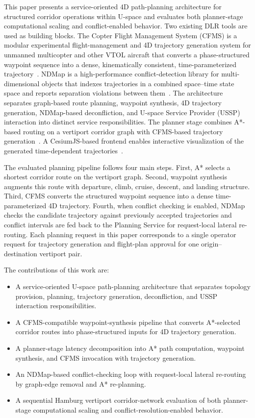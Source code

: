 This paper presents a service-oriented 4D path-planning architecture for structured corridor operations within U-space and evaluates both planner-stage computational scaling and conflict-enabled behavior. Two existing DLR tools are used as building blocks. The Copter Flight Management System (CFMS) is a modular experimental flight-management and 4D trajectory generation system for unmanned multicopter and other VTOL aircraft that converts a phase-structured waypoint sequence into a dense, kinematically consistent, time-parameterized trajectory~\cite{morscheck2021cfms}. NDMap is a high-performance conflict-detection library for multi-dimensional objects that indexes trajectories in a combined space--time state space and reports separation violations between them~\cite{NDMap}. The architecture separates graph-based route planning, waypoint synthesis, 4D trajectory generation, NDMap-based deconfliction, and U-space Service Provider (USSP) interaction into distinct service responsibilities. The planner stage combines A*-based routing on a vertiport corridor graph with CFMS-based trajectory generation~\cite{morscheck2021cfms}. A CesiumJS-based frontend enables interactive visualization of the generated time-dependent trajectories~\cite{cesiumjs_software}.

The evaluated planning pipeline follows four main steps. First, A* selects a shortest corridor route on the vertiport graph. Second, waypoint synthesis augments this route with departure, climb, cruise, descent, and landing structure. Third, CFMS converts the structured waypoint sequence into a dense time-parameterized 4D trajectory. Fourth, when conflict checking is enabled, NDMap checks the candidate trajectory against previously accepted trajectories and conflict intervals are fed back to the Planning Service for request-local lateral re-routing. Each planning request in this paper corresponds to a single operator request for trajectory generation and flight-plan approval for one origin--destination vertiport pair.

The contributions of this work are:
\begin{itemize}
    \item A service-oriented U-space path-planning architecture that separates topology provision, planning, trajectory generation, deconfliction, and USSP interaction responsibilities.
    \item A CFMS-compatible waypoint-synthesis pipeline that converts A*-selected corridor routes into phase-structured inputs for 4D trajectory generation.
    \item A planner-stage latency decomposition into A* path computation, waypoint synthesis, and CFMS invocation with trajectory generation.
    \item An NDMap-based conflict-checking loop with request-local lateral re-routing by graph-edge removal and A* re-planning.
    \item A sequential Hamburg vertiport corridor-network evaluation of both planner-stage computational scaling and conflict-resolution-enabled behavior.
\end{itemize}

